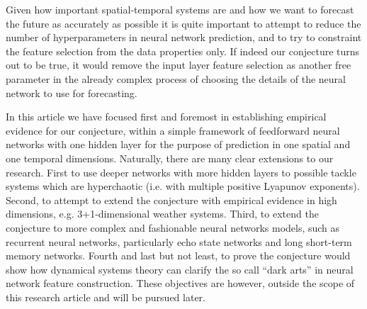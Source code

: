 \documentclass[journal]{IEEEtran}
\begin{document}
Given how important spatial-temporal systems are 
and how we want to forecast the future as accurately as possible 
it is quite 
important to attempt to reduce the number of hyperparameters in neural network prediction, and to try to constraint the feature selection from 
the data properties only. If indeed our conjecture turns out to be true, it would remove the input layer feature selection as another free 
parameter in the already complex process of choosing the details of the neural network to use for forecasting.

In this article we have focused first and foremost in establishing empirical evidence for our conjecture, within a simple framework of 
feedforward neural networks with one hidden layer for the purpose of prediction in one spatial and one temporal dimensions. Naturally, 
there are many clear extensions to our research. First to use deeper networks with more hidden 
layers to possible tackle systems which are hyperchaotic (i.e. with multiple positive Lyapunov exponents). Second, to attempt to extend the conjecture with empirical evidence in high 
dimensions, e.g. 3+1-dimensional weather systems. Third, to extend the conjecture to more complex and fashionable
neural networks models, such as recurrent neural networks, particularly echo state networks and long short-term memory networks.
 Fourth and last but not least, to prove the conjecture would show how dynamical systems theory can clarify the so call
 ``dark arts'' in neural network feature construction. These objectives are however, outside the scope
 of this research article and will be pursued later.


%
\end{document}
